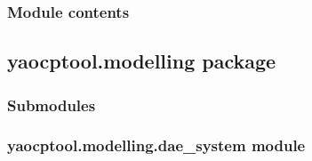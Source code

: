 \documentclass[letterpaper,10pt,english]{sphinxmanual}
\begin{document}
\begin{fulllineitems}
\begin{fulllineitems}
\label{\detokenize{yaocptool.methods:yaocptool.methods.distributed_solution.DistributedSolution.solve}}
\end{fulllineitems}


\begin{fulllineitems}
\label{\detokenize{yaocptool.methods:yaocptool.methods.distributed_solution.DistributedSolution.start}}
\end{fulllineitems}


\end{fulllineitems}



\subsubsection{Module contents}
\label{\detokenize{yaocptool.methods:module-yaocptool.methods}}\label{\detokenize{yaocptool.methods:module-contents}}

\subsection{yaocptool.modelling package}
\label{\detokenize{yaocptool.modelling:yaocptool-modelling-package}}\label{\detokenize{yaocptool.modelling::doc}}

\subsubsection{Submodules}
\label{\detokenize{yaocptool.modelling:submodules}}

\subsubsection{yaocptool.modelling.dae\_system module}
\label{\detokenize{yaocptool.modelling:module-yaocptool.modelling.dae_system}}\label{\detokenize{yaocptool.modelling:yaocptool-modelling-dae-system-module}}
\end{document}
